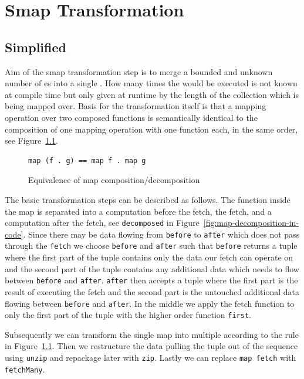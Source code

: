 \chapter{Smap Transformation}

\label{ch:smap-transformation}

\section{Simplified}

Aim of the smap transformation step is to merge a bounded and unknown number of \fetch{}es into a single \fetch{}.
How many times the \fetch{} would be executed is not known at compile time but only given at runtime by the length of the collection which is being mapped over.
Basis for the transformation itself is that a mapping operation over two composed functions is semantically identical to the composition of one mapping operation with one function each, in the same order, see Figure~\ref{fig:map-comp-decomp}.

\begin{figure}
\begin{verbatim}
map (f . g) == map f . map g
\end{verbatim}
    \caption{Equivalence of map composition/decomposition}
    \label{fig:map-comp-decomp}
\end{figure}


The basic transformation steps can be described as follows.
The function inside the map is separated into a computation before the fetch, the fetch, and a computation after the fetch, see \texttt{decomposed} in Figure~\ref{fig:map-decomposition-in-code}.
Since there may be data flowing from \texttt{before} to \texttt{after} which does not pass through the \texttt{fetch} we choose \texttt{before} and \texttt{after} such that \texttt{before} returns a tuple where the first part of the tuple contains only the data our fetch can operate on and the second part of the tuple contains any additional data which needs to flow between \texttt{before} and \texttt{after}.
\texttt{after} then accepts a tuple where the first part is the result of executing the fetch and the second part is the untouched additional data flowing between \texttt{before} and \texttt{after}.
In the middle we apply the fetch function to only the first part of the tuple with the higher order function \texttt{first}.

Subsequently we can transform the single map into multiple according to the rule in Figure~\ref{fig:map-comp-decomp}.
Then we restructure the data pulling the tuple out of the sequence using \texttt{unzip} and repackage later with \texttt{zip}.
Lastly we can replace \texttt{map fetch} with \texttt{fetchMany}.

